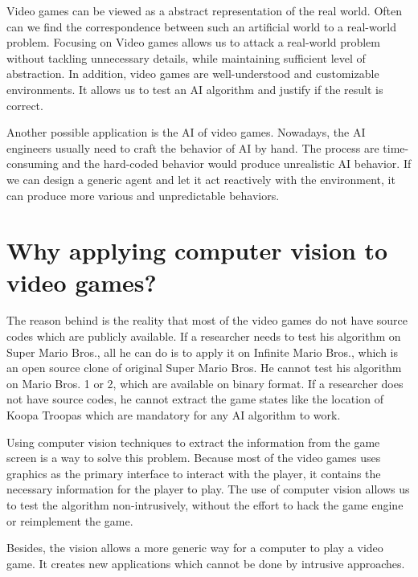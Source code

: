 Video games can be viewed as a abstract representation of the real world. Often can we find the 
correspondence between such an artificial world to a real-world problem\cite{KeepAway}.
Focusing on Video games allows us to attack a real-world problem without tackling unnecessary details, while maintaining sufficient 
level of abstraction. In addition, video games are well-understood and customizable environments. 
It allows us to test an AI algorithm and justify if the result is correct\cite{Yavar}.

Another possible application is the AI of video games.
Nowadays, the AI engineers usually need to craft the behavior of AI by hand. 
The process are time-consuming and the hard-coded behavior would produce unrealistic AI behavior.
If we can design a generic agent and let it act reactively with the environment, it can produce 
more various and unpredictable behaviors.

\section{Why applying computer vision to video games?}

The reason behind is the reality that most of the video games do not have source codes which are publicly available.
If a researcher needs to test his algorithm on Super Mario Bros., all he can do is to apply it on Infinite Mario Bros.,
which is an open source clone of original Super Mario Bros. He cannot test his algorithm on Mario Bros. 1 or 2, which are available
on binary format. If a researcher does not have source codes, he cannot extract the game states like the location
of Koopa Troopas which are mandatory for any AI algorithm to work. 

Using computer vision techniques to extract the information from the game screen is a way to solve this problem.
Because most of the video games uses graphics as the primary interface to interact with the player, it contains
the necessary information for the player to play. The use of computer vision allows us to test the algorithm
non-intrusively, without the effort to hack the game engine or reimplement the game.

Besides, the vision allows a more generic way for a computer to play a video game. It creates 
new applications which cannot be done by intrusive approaches.

